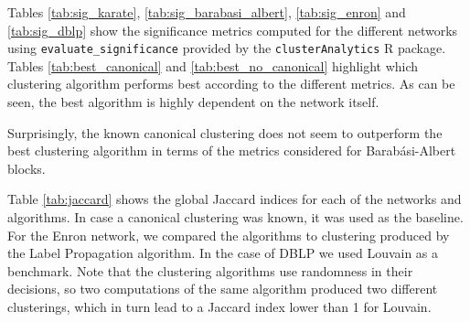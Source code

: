 Tables \ref{tab:sig_karate}, \ref{tab:sig_barabasi_albert},  \ref{tab:sig_enron} and \ref{tab:sig_dblp} show the significance metrics computed for the different networks using \verb|evaluate_significance| provided by the \verb|clusterAnalytics| R package. Tables \ref{tab:best_canonical} and \ref{tab:best_no_canonical} highlight which clustering algorithm performs best according to the different metrics. As can be seen, the best algorithm is highly dependent on the network itself.

Surprisingly, the known canonical clustering does not seem to outperform the best clustering algorithm in terms of the metrics considered for Barabási-Albert blocks.

Table \ref{tab:jaccard} shows the global Jaccard indices for each of the networks and algorithms. In case a canonical clustering was known, it was used as the baseline. For the Enron network, we compared the algorithms to clustering produced by the Label Propagation algorithm. In the case of DBLP we used Louvain as a benchmark. Note that the clustering algorithms use randomness in their decisions, so two computations of the same algorithm produced two different clusterings, which in turn lead to a Jaccard index lower than 1 for Louvain.





